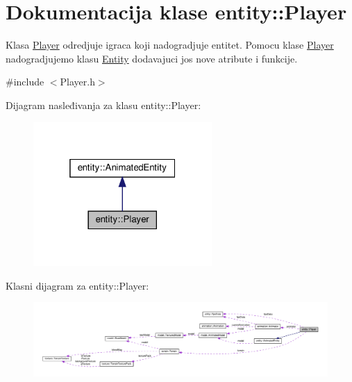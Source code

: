 \hypertarget{classentity_1_1Player}{}\section{Dokumentacija klase entity\+:\+:Player}
\label{classentity_1_1Player}


Klasa \hyperlink{classentity_1_1Player}{Player} odredjuje igraca koji nadogradjuje entitet. Pomocu klase \hyperlink{classentity_1_1Player}{Player} nadogradjujemo klasu \hyperlink{classentity_1_1Entity}{Entity} dodavajuci jos nove atribute i funkcije.  




{\ttfamily \#include $<$Player.\+h$>$}



Dijagram nasleđivanja za klasu entity\+:\+:Player\+:
\nopagebreak
\begin{figure}[H]
\begin{center}
\leavevmode
\includegraphics[width=193pt]{classentity_1_1Player__inherit__graph}
\end{center}
\end{figure}


Klasni dijagram za entity\+:\+:Player\+:
\nopagebreak
\begin{figure}[H]
\begin{center}
\leavevmode
\includegraphics[width=350pt]{classentity_1_1Player__coll__graph}
\end{center}
\end{figure}
